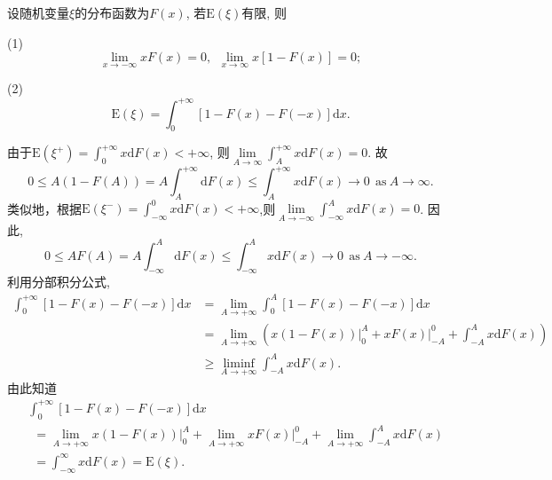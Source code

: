 \begin{yyEx}
	设随机变量$\xi$的分布函数为$F(x)$, 若$\mathrm{E}(\xi)$有限, 则
	\begin{blist}
		\item[(1)] \begin{equation}
		\lim_{x\to-\infty}xF(x) = 0,~~\lim_{x\to\infty}x\left[ 1-F(x) \right] = 0;
		\end{equation}
		\item[(2)] \begin{equation}
		\mathrm{E}(\xi) = \int_{0}^{+\infty}\left[1-F(x)-F(-x)\right]\mathrm{d}x.
		\end{equation}
	\end{blist}
\end{yyEx}
	\begin{yyProof}
	由于$\mathrm{E}(\xi^+) = \int_{0}^{+\infty}x\mathrm{d}F(x)<+\infty$, 则$\lim\limits_{A\to\infty}\int_{A}^{+\infty}x\mathrm{d}F(x) = 0$. 故
	\begin{equation}
	0\leqslant A(1-F(A))=A\int_{A}^{+\infty}\mathrm{d}F(x) \leqslant \int_{A}^{+\infty}x\mathrm{d}F(x)\to 0~~\text{as}~ A\to\infty.
	\end{equation}	类似地，根据$\mathrm{E}(\xi^-) = \int_{-\infty}^0x\mathrm{d}F(x)<+\infty$,则$\lim\limits_{A\to-\infty}\int_{-\infty}^{A}x\mathrm{d}F(x) = 0$. 因此,
	\begin{equation}
	0\leqslant AF(A) = A\int_{-\infty}^{A}\mathrm{d}F(x)\leqslant \int_{-\infty}^Ax\mathrm{d}F(x)\to 0~~\text{as}~A\to-\infty.
	\end{equation}利用分部积分公式,\begin{align}
	\int_0^{+\infty}\left[1-F(x)-F(-x)\right]\mathrm{d}x &= \lim_{A\to+\infty}\int_0^{A}\left[1-F(x)-F(-x)\right]\mathrm{d}x \nonumber\\
	&=\lim_{A\to+\infty}\left( x(1-F(x))\big\vert_0^A + xF(x)\big\vert_{-A}^0 +\int_{-A}^Ax\mathrm{d}F(x)\right)\nonumber\\
	&\geqslant \liminf_{A\to+\infty}\int_{-A}^Ax\mathrm{d}F(x).
	\end{align}
	由此知道\begin{align}
	&\int_0^{+\infty}\left[1-F(x)-F(-x)\right]\mathrm{d}x \\
	&~~= \lim_{A\to+\infty}x(1-F(x))\big\vert_0^A+\lim_{A\to+\infty}xF(x)\big\vert_{-A}^0+\lim_{A\to+\infty}\int_{-A}^Ax\mathrm{d}F(x)\nonumber\\
	&~~=\int_{-\infty}^{\infty}x\mathrm{d}F(x) = \mathrm{E}(\xi).
	\end{align}
\end{yyProof}


